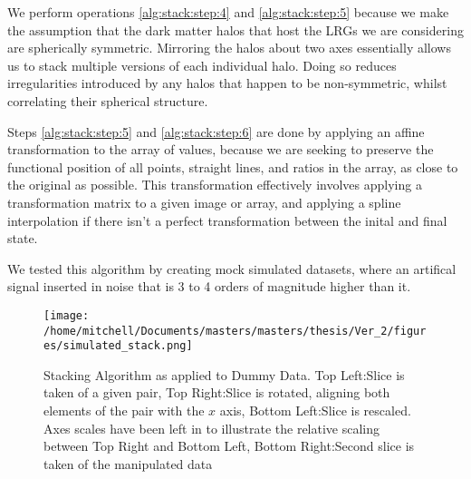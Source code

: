 
We perform operations \ref{alg:stack:step:4} and \ref{alg:stack:step:5} because we make the assumption that the dark matter halos that host the LRGs we are considering are spherically symmetric. Mirroring the halos about two axes essentially allows us to stack multiple versions of each individual halo. Doing so reduces irregularities introduced by any halos that happen to be non-symmetric, whilst correlating their spherical structure. 

Steps \ref{alg:stack:step:5} and \ref{alg:stack:step:6} are done by applying an affine transformation to the array of values, because we are seeking to preserve the functional position of all points, straight lines, and ratios in the array, as close to the original as possible. This transformation effectively involves applying a transformation matrix to a given image or array, and applying a spline interpolation if there isn't a perfect transformation between the inital and final state.




 



We tested this algorithm by creating mock simulated datasets, where an artifical signal inserted in noise that is 3 to 4 orders of magnitude higher than it. 

\begin{figure}[H]
\begin{center}

\texttt{[image: /home/mitchell/Documents/masters/masters/thesis/Ver\_2/figures/simulated\_stack.png]}
\caption{Stacking Algorithm as applied to Dummy Data. Top Left:Slice is taken of a given pair, Top Right:Slice is rotated, aligning both elements of the pair with the $x$ axis, Bottom Left:Slice is rescaled. Axes scales have been left in to illustrate the relative scaling between Top Right and Bottom Left, Bottom Right:Second slice is taken of the manipulated data}
\end{center}
\end{figure}


